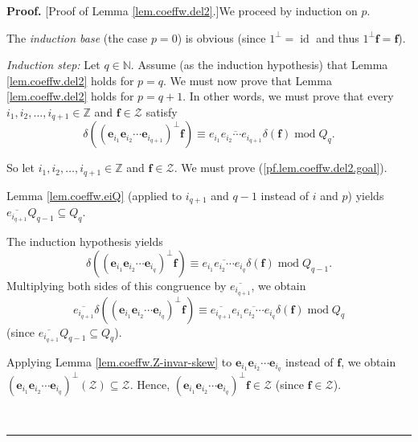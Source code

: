 \documentclass[numbers=enddot,12pt,final,onecolumn,notitlepage]{scrartcl}%
\theoremstyle{definition}
\newenvironment{proof}[1][Proof]{\noindent\textbf{#1.} }{\ \rule{0.5em}{0.5em}}
\begin{document}
\begin{proof}
[Proof of Lemma \ref{lem.coeffw.del2}.]We proceed by induction on $p$.

The \textit{induction base} (the case $p=0$) is obvious (since $1^{\perp
}=\operatorname*{id}$ and thus $1^{\perp}\mathbf{f}=\mathbf{f}$).

\textit{Induction step:} Let $q\in\mathbb{N}$. Assume (as the induction
hypothesis) that Lemma \ref{lem.coeffw.del2} holds for $p=q$. We must now
prove that Lemma \ref{lem.coeffw.del2} holds for $p=q+1$. In other words, we
must prove that every $i_{1},i_{2},\ldots,i_{q+1}\in\mathbb{Z}$ and
$\mathbf{f}\in\mathcal{Z}$ satisfy
\begin{equation}
\delta\left(  \left(  \mathbf{e}_{i_{1}}\mathbf{e}_{i_{2}}\cdots
\mathbf{e}_{i_{q+1}}\right)  ^{\perp}\mathbf{f}\right)  \equiv\overline
{e_{i_{1}}e_{i_{2}}\cdots e_{i_{q+1}}}\delta\left(  \mathbf{f}\right)
\operatorname{mod}Q_{q}. \label{pf.lem.coeffw.del2.goal}%
\end{equation}


So let $i_{1},i_{2},\ldots,i_{q+1}\in\mathbb{Z}$ and $\mathbf{f}\in
\mathcal{Z}$. We must prove (\ref{pf.lem.coeffw.del2.goal}).

Lemma \ref{lem.coeffw.eiQ} (applied to $i_{q+1}$ and $q-1$ instead of $i$ and
$p$) yields $\overline{e_{i_{q+1}}}Q_{q-1}\subseteq Q_{q}$.

The induction hypothesis yields
\[
\delta\left(  \left(  \mathbf{e}_{i_{1}}\mathbf{e}_{i_{2}}\cdots
\mathbf{e}_{i_{q}}\right)  ^{\perp}\mathbf{f}\right)  \equiv\overline
{e_{i_{1}}e_{i_{2}}\cdots e_{i_{q}}}\delta\left(  \mathbf{f}\right)
\operatorname{mod}Q_{q-1}.
\]
Multiplying both sides of this congruence by $\overline{e_{i_{q+1}}}$, we
obtain%
\begin{equation}
\overline{e_{i_{q+1}}}\delta\left(  \left(  \mathbf{e}_{i_{1}}\mathbf{e}%
_{i_{2}}\cdots\mathbf{e}_{i_{q}}\right)  ^{\perp}\mathbf{f}\right)
\equiv\overline{e_{i_{q+1}}}\overline{e_{i_{1}}e_{i_{2}}\cdots e_{i_{q}}%
}\delta\left(  \mathbf{f}\right)  \operatorname{mod}Q_{q}
\label{pf.lem.coeffw.del2.2}%
\end{equation}
(since $\overline{e_{i_{q+1}}}Q_{q-1}\subseteq Q_{q}$).

Applying Lemma \ref{lem.coeffw.Z-invar-skew} to $\mathbf{e}_{i_{1}}%
\mathbf{e}_{i_{2}}\cdots\mathbf{e}_{i_{q}}$ instead of $\mathbf{f}$, we obtain
$\left(  \mathbf{e}_{i_{1}}\mathbf{e}_{i_{2}}\cdots\mathbf{e}_{i_{q}}\right)
^{\perp}\left(  \mathcal{Z}\right)  \subseteq\mathcal{Z}$. Hence, $\left(
\mathbf{e}_{i_{1}}\mathbf{e}_{i_{2}}\cdots\mathbf{e}_{i_{q}}\right)  ^{\perp
}\mathbf{f}\in\mathcal{Z}$ (since $\mathbf{f}\in\mathcal{Z}$).


\end{proof}
\end{document}
